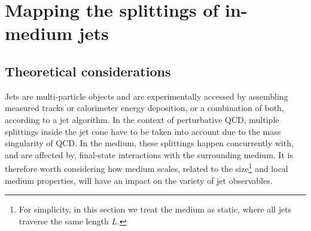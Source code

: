 
\section{Mapping the splittings of in-medium jets}
\label{sec:phasespace}


\subsection{Theoretical considerations}
\label{sec:phasespace-theory}


Jets are multi-particle objects and are experimentally accessed by assembling measured tracks or calorimeter energy deposition, or a combination of both, according to a jet algorithm. In the context of perturbative QCD, multiple splittings inside the jet cone have to be taken into account due to the mass singularity of QCD. 
In the medium, these splittings happen concurrently with, and are affected by, final-state interactions with the surrounding medium. It is therefore worth considering how medium scales, related to the size\footnote{For simplicity, in this section we treat the medium as static, where all jets traverse the same length $L$.} and local medium properties, will have an impact on the variety of jet observables. 

